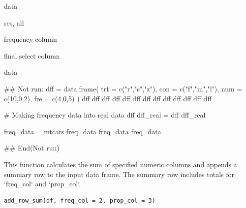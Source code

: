 \documentclass[a4paper]{book}
\begin{document}
%
\begin{Arguments}
\begin{ldescription}
\item[\code{data}] data

\item[\code{type}] res, all

\item[\code{sel}] frequency column

\item[\code{fix}] final select column
\end{ldescription}
\end{Arguments}
%
\begin{Value}
data
\end{Value}
%
\begin{Examples}
\begin{ExampleCode}

## Not run: 
dff = data.frame(
  trt = c("r","s","z"),
  con = c("f","m","l"),
  num = c(10,0,2),
  fre = c(4,0,5) )
dff
dff %
dff %
dff %
dff %
dff %
dff %
dff %
dff %
dff %
dff %
dff %
dff %


# Making frequency data into real data
dff %
 dff_real =  dff %
 dff_real


 freq_data =  mtcars %
 freq_data%
 freq_data%
 freq_data%



## End(Not run)


\end{ExampleCode}
\end{Examples}
%
\begin{Description}
This function calculates the sum of specified numeric columns and appends a summary row
to the input data frame. The summary row includes totals for `freq\_col` and `prop\_col`.
\end{Description}
%
\begin{Usage}
\begin{verbatim}
add_row_sum(df, freq_col = 2, prop_col = 3)
\end{verbatim}
\end{Usage}
\end{document}
